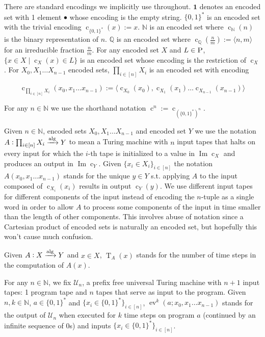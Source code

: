 \documentclass[11pt]{article}
\numberwithin{equation}{section}
\theoremstyle{definition}
\theoremstyle{plain}
\newcommand{\Bool}{\{0,1\}}
\newcommand{\Words}{{\Bool^*}}
\DeclareMathOperator{\Img}{Im}
\DeclareMathOperator{\Ev}{ev}
\DeclareMathOperator{\T}{T}
\DeclareMathOperator{\En}{c}
\newcommand{\Nats}{\mathbb{N}}
\newcommand{\Rats}{\mathbb{Q}}
\newcommand{\Chev}[1]{\langle #1 \rangle}
\newcommand{\Alg}{\xrightarrow{\textnormal{alg}}}
\begin{document}
There are standard encodings we implicitly use throughout. $\bm{1}$ denotes an encoded set with 1 element $\bullet$ whose encoding is the empty string. $\Words$ is an encoded set with the trivial encoding ${\En_\Words(x):=x}$. $\Nats$ is an encoded set where $\En_\Nats(n)$ is the binary representation of $n$. $\Rats$ is an encoded set where ${\En_\Rats(\frac{n}{m}):=\Chev{n,m}}$ for an irreducible fraction $\frac{n}{m}$. For any encoded set $X$ and $L \in \textsc{P}$, $\{x \in X \mid \En_X(x) \in L\}$ is an encoded set whose encoding is the restriction of $\En_X$. For $X_0,X_1 \ldots X_{n-1}$ encoded sets, $\prod_{i \in [n]} X_i$ is an encoded set with encoding 

\[\En_{\prod_{i \in [n]} X_i}(x_0,x_1 \ldots x_{n-1}):=\Chev{\En_{X_0}(x_0),\En_{X_1}(x_1) \ldots \En_{X_{n-1}}(x_{n-1})}\]

For any $n \in \Nats$ we use the shorthand notation $\En^n:=\En_{(\Words)^n}$.

Given $n \in \Nats$, encoded sets $X_0, X_1 \ldots X_{n-1}$ and encoded set $Y$ we use the notation\\ ${A: \prod_{i \in [n]} X_i \Alg Y}$ to mean a Turing machine with $n$ input tapes that halts on every input for which the $i$-th tape is initialized to a value in $\Img \En_X$ and produces an output in $\Img \En_Y$. Given $\{x_i \in X_i\}_{i \in [n]}$ the notation $A(x_0, x_1 \ldots x_{n-1})$ stands for the unique $y \in Y$ s.t. applying $A$ to the input composed of $\En_{X_i}(x_i)$ results in output $\En_Y(y)$. We use different input tapes for different components of the input instead of encoding the $n$-tuple as a single word in order to allow $A$ to process some components of the input in time smaller than the length of other components. This involves abuse of notation since a Cartesian product of encoded sets is naturally an encoded set, but hopefully this won't cause much confusion.

Given $A: X \Alg Y$ and $x \in X$, $\T_A(x)$ stands for the number of time steps in the computation of $A(x)$.

For any $n \in \Nats$, we fix $\mathcal{U}_n$, a prefix free universal Turing machine with $n+1$ input tapes: 1 program tape and $n$ tapes that serve as input to the program. Given ${n,k \in \Nats}$, ${a \in \Words}$ and ${\{x_i \in \Words\}_{i \in [n]}}$, ${\Ev^k(a;x_0,x_1 \ldots x_{n-1})}$ stands for the output of ${\mathcal{U}_n}$ when executed for ${k}$ time steps on program ${a}$ (continued by an infinite sequence of 0s) and inputs ${\{x_i \in \Words\}_{i \in [n]}}$.
\end{document}
